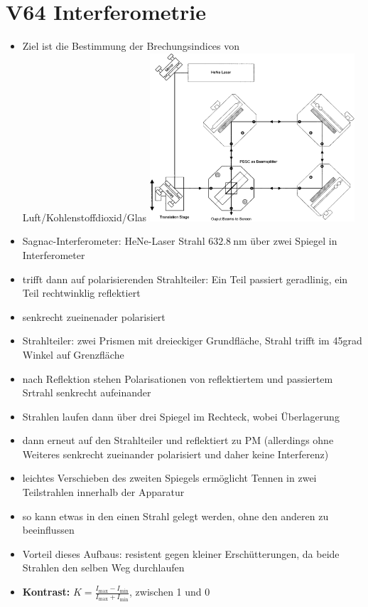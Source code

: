 \section{V64 Interferometrie}
\label{sec:V64}

\begin{itemize}
    \item Ziel ist die Bestimmung der Brechungsindices von Luft/Kohlenstoffdioxid/Glas
        \includegraphics[width=0.6\textwidth]{figures/sagnac.pdf}
    \item Sagnac-Interferometer: HeNe-Laser Strahl $\SI{632,8}{\nano\meter}$ über zwei Spiegel in Interferometer
    \item trifft dann auf polarisierenden Strahlteiler: Ein Teil passiert geradlinig, ein Teil rechtwinklig reflektiert
    \item senkrecht zueinenader polarisiert
    \item Strahlteiler: zwei Prismen mit dreieckiger Grundfläche, Strahl trifft im 45grad Winkel auf Grenzfläche
    \item nach Reflektion stehen Polarisationen von reflektiertem und passiertem Srtrahl senkrecht aufeinander
    \item Strahlen laufen dann über drei Spiegel im Rechteck, wobei Überlagerung
    \item dann erneut auf den Strahlteiler und reflektiert zu PM (allerdings ohne Weiteres senkrecht zueinander polarisiert und daher keine Interferenz)
    \item leichtes Verschieben des zweiten Spiegels ermöglicht Tennen in zwei Teilstrahlen innerhalb der Apparatur
    \item so kann etwas in den einen Strahl gelegt werden, ohne den anderen zu beeinflussen
    \item Vorteil dieses Aufbaus: resistent gegen kleiner Erschütterungen, da beide Strahlen den selben Weg durchlaufen
    \item \textbf{Kontrast:} $K=\frac{I_\text{max}-I_\text{min}}{I_\text{max}+I_\text{min}}$, zwischen 1 und 0

\end{itemize}
